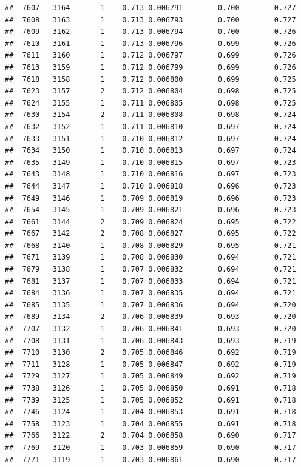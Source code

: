 \documentclass[
]{book}
\begin{document}
\begin{verbatim}
##  7607   3164       1    0.713 0.006791        0.700        0.727
##  7608   3163       1    0.713 0.006793        0.700        0.727
##  7609   3162       1    0.713 0.006794        0.700        0.726
##  7610   3161       1    0.713 0.006796        0.699        0.726
##  7611   3160       1    0.712 0.006797        0.699        0.726
##  7613   3159       1    0.712 0.006799        0.699        0.726
##  7618   3158       1    0.712 0.006800        0.699        0.725
##  7623   3157       2    0.712 0.006804        0.698        0.725
##  7624   3155       1    0.711 0.006805        0.698        0.725
##  7630   3154       2    0.711 0.006808        0.698        0.724
##  7632   3152       1    0.711 0.006810        0.697        0.724
##  7633   3151       1    0.710 0.006812        0.697        0.724
##  7634   3150       1    0.710 0.006813        0.697        0.724
##  7635   3149       1    0.710 0.006815        0.697        0.723
##  7643   3148       1    0.710 0.006816        0.697        0.723
##  7644   3147       1    0.710 0.006818        0.696        0.723
##  7649   3146       1    0.709 0.006819        0.696        0.723
##  7654   3145       1    0.709 0.006821        0.696        0.723
##  7661   3144       2    0.709 0.006824        0.695        0.722
##  7667   3142       2    0.708 0.006827        0.695        0.722
##  7668   3140       1    0.708 0.006829        0.695        0.721
##  7671   3139       1    0.708 0.006830        0.694        0.721
##  7679   3138       1    0.707 0.006832        0.694        0.721
##  7681   3137       1    0.707 0.006833        0.694        0.721
##  7684   3136       1    0.707 0.006835        0.694        0.721
##  7685   3135       1    0.707 0.006836        0.694        0.720
##  7689   3134       2    0.706 0.006839        0.693        0.720
##  7707   3132       1    0.706 0.006841        0.693        0.720
##  7708   3131       1    0.706 0.006843        0.693        0.719
##  7710   3130       2    0.705 0.006846        0.692        0.719
##  7711   3128       1    0.705 0.006847        0.692        0.719
##  7729   3127       1    0.705 0.006849        0.692        0.719
##  7738   3126       1    0.705 0.006850        0.691        0.718
##  7739   3125       1    0.705 0.006852        0.691        0.718
##  7746   3124       1    0.704 0.006853        0.691        0.718
##  7758   3123       1    0.704 0.006855        0.691        0.718
##  7766   3122       2    0.704 0.006858        0.690        0.717
##  7769   3120       1    0.703 0.006859        0.690        0.717
##  7771   3119       1    0.703 0.006861        0.690        0.717

\end{verbatim}
\end{document}
